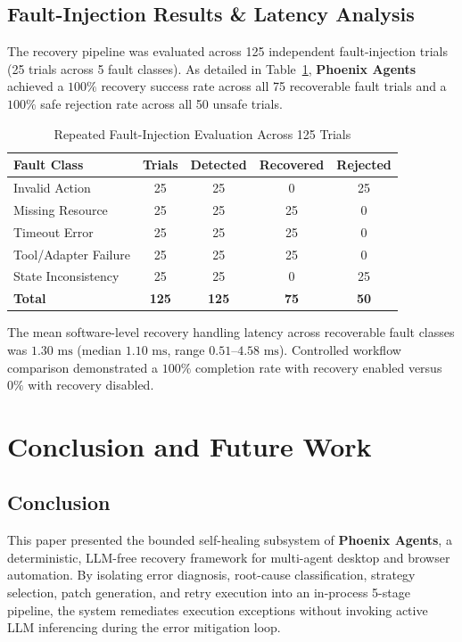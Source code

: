\documentclass[conference]{IEEEtran}
\begin{document}
\subsection{Fault-Injection Results & Latency Analysis}
The recovery pipeline was evaluated across 125 independent fault-injection trials (25 trials across 5 fault classes). As detailed in Table~\ref{tab:fault_injection_results}, \textbf{Phoenix Agents} achieved a $100\%$ recovery success rate across all 75 recoverable fault trials and a $100\%$ safe rejection rate across all 50 unsafe trials.

\begin{table}[htbp]
\caption{Repeated Fault-Injection Evaluation Across 125 Trials}
\label{tab:fault_injection_results}
\centering
\begin{tabular}{l c c c c}
\toprule
\textbf{Fault Class} & \textbf{Trials} & \textbf{Detected} & \textbf{Recovered} & \textbf{Rejected} \\
\midrule
Invalid Action & 25 & 25 & 0 & 25 \\
Missing Resource & 25 & 25 & 25 & 0 \\
Timeout Error & 25 & 25 & 25 & 0 \\
Tool/Adapter Failure & 25 & 25 & 25 & 0 \\
State Inconsistency & 25 & 25 & 0 & 25 \\
\midrule
\textbf{Total} & \textbf{125} & \textbf{125} & \textbf{75} & \textbf{50} \\
\bottomrule
\end{tabular}
\end{table}

The mean software-level recovery handling latency across recoverable fault classes was $1.30\text{ ms}$ (median $1.10\text{ ms}$, range $0.51\text{--}4.58\text{ ms}$). Controlled workflow comparison demonstrated a $100\%$ completion rate with recovery enabled versus $0\%$ with recovery disabled.

\section{Conclusion and Future Work}
\label{sec:conclusion}

\subsection{Conclusion}
This paper presented the bounded self-healing subsystem of \textbf{Phoenix Agents}, a deterministic, LLM-free recovery framework for multi-agent desktop and browser automation. By isolating error diagnosis, root-cause classification, strategy selection, patch generation, and retry execution into an in-process 5-stage pipeline, the system remediates execution exceptions without invoking active LLM inferencing during the error mitigation loop.
\end{document}

